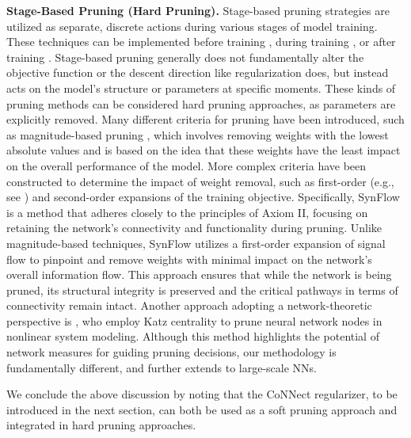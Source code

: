 \textbf{Stage-Based Pruning (Hard Pruning).}
Stage-based pruning strategies are utilized as separate, discrete actions during various stages of model training. These techniques can be implemented before training \citep{lee2018snip,tanaka2020pruning,wang2020picking}, during training \citep{frankle2018lottery}, or after training \citep{hagiwara1993removal, thimm1995evaluating, gale2019state, ma2023llm}.
Stage-based pruning generally does not fundamentally alter the objective function or the descent direction like regularization does, but instead acts on the model’s structure or parameters at specific moments.
These kinds of pruning methods can be considered hard pruning approaches, as parameters are explicitly removed.
Many different criteria for pruning have been introduced, such as magnitude-based pruning \citep{hagiwara1993removal, gale2019state}, which involves removing weights with the lowest absolute values and is based on the idea that these weights have the least impact on the overall performance of the model.
More complex criteria have been constructed to determine the impact of weight removal, such as first-order (e.g., see \citep{zhou1999subset, molchanov2016pruning, sanh2020movement}) and second-order expansions \citep{lecun1989optimal, hassibi1993optimal, ma2023llm} of the training objective.
Specifically, SynFlow \citep{tanaka2020pruning} is a method that adheres closely to the principles of Axiom II, focusing on retaining the network's connectivity and functionality during pruning. 
Unlike magnitude-based techniques, SynFlow utilizes a first-order expansion of signal flow to pinpoint and remove weights with minimal impact on the network's overall information flow. 
This approach ensures that while the network is being pruned, its structural integrity is preserved and the critical pathways in terms of connectivity remain intact.
Another approach adopting a network-theoretic perspective is \citet{li2020pruning}, who employ Katz centrality to prune neural network nodes in nonlinear system modeling. Although this method highlights the potential of network measures for guiding pruning decisions, our methodology is fundamentally different, and further extends to large-scale NNs.



We conclude the above discussion by noting that the CoNNect regularizer, to be introduced in the next section, can both be used as a soft pruning approach and integrated in hard pruning approaches.